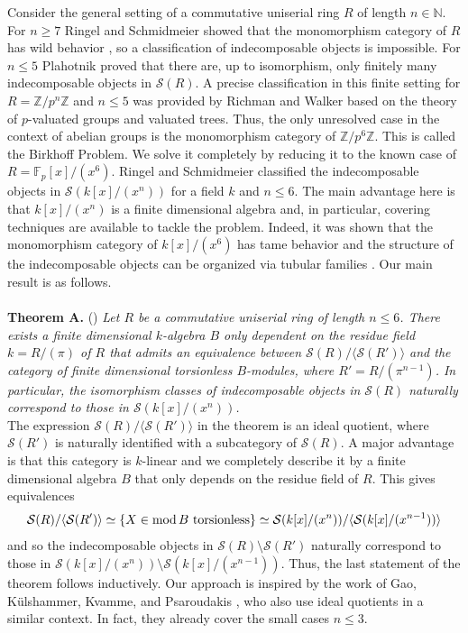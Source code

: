 \documentclass[a4paper]{amsart}
\renewcommand{\mod}{\textnormal{mod}\,}
\numberwithin{equation}{section} \theoremstyle{plain}
\numberwithin{thm}{section}
\begin{document}
Consider the general setting of a commutative uniserial ring $R$ of length $n\in \mathbb{N}$. For $n\geq 7$ Ringel and Schmidmeier showed that the monomorphism category of $R$ has wild behavior \cite{RS}, so a classification of indecomposable objects is impossible. For $n\leq 5$ Plahotnik \cite{plahotnik} proved that there are, up to isomorphism, only finitely many indecomposable objects in $\mathcal{S}(R)$. A precise classification in this finite setting for $R= \mathbb{Z}/p^n \mathbb{Z}$ and $n \leq 5$ was provided by Richman and Walker \cite{RW, RW2} based on the theory of $p$-valuated groups and valuated trees. Thus, the only unresolved case in the context of abelian groups is the monomorphism category of $\mathbb{Z}/p^6 \mathbb{Z}$. This is called the Birkhoff Problem. We solve it completely by reducing it to the known case of $R = \mathbb{F}_p[x]/(x^6)$. Ringel and Schmidmeier \cite{RS2} classified the indecomposable objects in $\mathcal{S}(k[x]/(x^n))$ for a field $k$ and $n \leq 6$. The main advantage here is that $k[x]/(x^n)$ is a finite dimensional algebra and, in particular, covering techniques are available to tackle the problem. Indeed, it was shown that the monomorphism category of $k[x]/(x^6)$ has tame behavior and the structure of the indecomposable objects can be organized via tubular families 
\cite{RS2}. Our main result is as follows.
\\
\\
\textbf{Theorem A.} () \emph{Let $R$ be a commutative uniserial ring of length $n \leq 6$. There exists a finite dimensional $k$-algebra $B$ only dependent on the residue field $k = R/(\pi)$ of $R$ that admits an equivalence between $\mathcal{S}(R)/\langle \mathcal{S}(R') \rangle$ and the category of finite dimensional torsionless $B$-modules, where $R' = R/(\pi^{n-1})$. In particular, the isomorphism classes of indecomposable objects in $\mathcal{S}(R)$ naturally correspond to those in $\mathcal{S}(k[x]/(x^n))$.} \\

The expression $\mathcal{S}(R)/\langle \mathcal{S}(R') \rangle$ in the theorem is an ideal quotient, where $\mathcal{S}(R')$ is naturally identified with a subcategory of $\mathcal{S}(R)$. A major advantage is that this category is $k$-linear and we completely describe it by a finite dimensional algebra $B$ that only depends on the residue field of $R$. This gives equivalences
\begin{align*}
    \mathcal{S}(R)/ \langle \mathcal{S}(R') \rangle \simeq \{X\in \mod B \text{ torsionless}\} \simeq \mathcal{S}(k[x]/(x^n))/ \langle \mathcal{S}(k[x]/(x^{n-1}))\rangle
\end{align*}
and so the indecomposable objects in $\mathcal{S}(R) \setminus \mathcal{S}(R')$ naturally correspond to those in $\mathcal{S}(k[x]/(x^n))\setminus \mathcal{S}(k[x]/(x^{n-1}))$. Thus, the last statement of the theorem follows inductively. Our approach is inspired by the work of Gao, K\"ulshammer, Kvamme, and Psaroudakis \cite{GKKP}, who also use ideal quotients in a similar context. In fact, they already cover the small cases $n\leq 3$.
\end{document}

